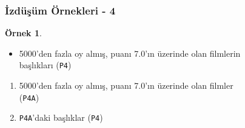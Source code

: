 \documentclass[dvipsnames]{beamer}
\theoremstyle{definition}
\theoremstyle{example}
\newtheorem{ornek}[theorem]{Örnek}
\theoremstyle{plain}
\begin{document}
\begin{frame}
  \frametitle{İzdüşüm Örnekleri - 4}

  \begin{ornek}
    \begin{itemize}
      \item 5000'den fazla oy almış, puanı 7.0'ın üzerinde olan filmlerin\\
        başlıkları (\texttt{P4})
    \end{itemize}

    \pause
    \begin{enumerate}
      \item 5000'den fazla oy almış, puanı 7.0'ın üzerinde olan filmler\\
        (\texttt{P4A})

      \pause
      \item \texttt{P4A}'daki başlıklar (\texttt{P4})
    \end{enumerate}
  \end{ornek}
\end{frame}
\end{document}
